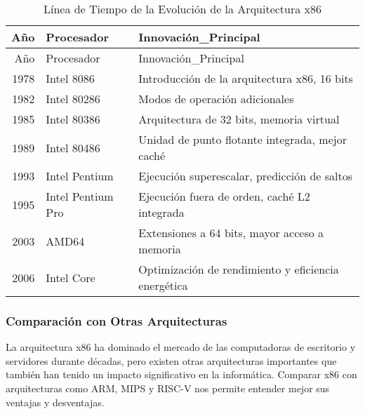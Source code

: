 \documentclass[12pt,twoside]{templates/unerthesis}
\begin{document}
\begin{longtable}[]{@{}rll@{}}
\caption{\label{tab:tabla-evolucion-x86}Línea de Tiempo de la Evolución de la Arquitectura x86}\tabularnewline
\toprule
Año & Procesador & Innovación\_Principal\tabularnewline
\midrule
\endfirsthead
\toprule
Año & Procesador & Innovación\_Principal\tabularnewline
\midrule
\endhead
1978 & Intel 8086 & Introducción de la arquitectura x86, 16 bits\tabularnewline
1982 & Intel 80286 & Modos de operación adicionales\tabularnewline
1985 & Intel 80386 & Arquitectura de 32 bits, memoria virtual\tabularnewline
1989 & Intel 80486 & Unidad de punto flotante integrada, mejor caché\tabularnewline
1993 & Intel Pentium & Ejecución superescalar, predicción de saltos\tabularnewline
1995 & Intel Pentium Pro & Ejecución fuera de orden, caché L2 integrada\tabularnewline
2003 & AMD64 & Extensiones a 64 bits, mayor acceso a memoria\tabularnewline
2006 & Intel Core & Optimización de rendimiento y eficiencia energética\tabularnewline
\bottomrule
\end{longtable}

\hypertarget{comparaciuxf3n-con-otras-arquitecturas}{%
\subsubsection{Comparación con Otras Arquitecturas}\label{comparaciuxf3n-con-otras-arquitecturas}}

La arquitectura x86 ha dominado el mercado de las computadoras de escritorio y servidores durante décadas, pero existen otras arquitecturas importantes que también han tenido un impacto significativo en la informática. Comparar x86 con arquitecturas como ARM, MIPS y RISC-V nos permite entender mejor sus ventajas y desventajas.
\end{document}
